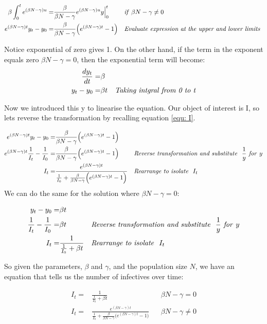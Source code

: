\documentclass[fontsize=17pt]{article}
\begin{document}
 \begin{align}
\beta \int_{0}^{t}e^{(\beta N- \gamma)u}=&\frac{\beta}{\beta N-\gamma}e^{(\beta N- \gamma)u}y\Big|_0^t&& \text{\textit{if} }\beta N-\gamma \neq 0\\
e^{(\beta N- \gamma)t}y_{t}-y_{0}=&\frac{\beta}{\beta N-\gamma}\Big(e^{(\beta N- \gamma)t}-1\Big)&& \text{\textit{Evaluate expression at the upper and lower limits} }
\end{align}

Notice exponential of zero gives 1. On the other hand, if the term in the exponent equals zero $\beta N -\gamma=0$, then the exponential term will become:
\begin{align}
	\frac{dy_{t}}{dt}=&\beta&&\\
	y_{t}-y_{0}=&\beta t&& \text{\textit{Taking intgral from 0 to t}}
\end{align}

Now we introduced this y to linearise the equation. Our object of interest is I, so lets reverse the transformation by recalling equation \ref{equ: I}.

 \begin{align}
e^{(\beta N- \gamma)t}y_{t}-y_{0}=&\frac{\beta}{\beta N-\gamma}\Big(e^{(\beta N- \gamma)t}-1\Big)&&\\
e^{(\beta N- \gamma)t}\frac{1}{I_{t}}-\frac{1}{I_{0}}=&\frac{\beta}{\beta N-\gamma}\Big(e^{(\beta N- \gamma)t}-1\Big)&& \text{\textit{Reverse transformation and substitute } }\frac{1}{y} \text{\textit{ for }} y\\
I_{t}=&\frac{e^{(\beta N- \gamma)t}}{\frac{1}{I_{0}}+\frac{\beta}{\beta N-\gamma}\Big(e^{(\beta N- \gamma)t}-1\Big)}&& \text{\textit{Rearrange to isolate } }I_{t}
\end{align}
We can do the same for the solution where $\beta N -\gamma=0$:

\begin{align}
y_{t}-y_{0}=&\beta t&&\\
\frac{1}{I_{t}}-\frac{1}{I_{0}}=&\beta t&& \text{\textit{Reverse transformation and substitute } }\frac{1}{y} \text{\textit{ for }} y\\
I_{t}=&\frac{1}{\frac{1}{I_{0}}+\beta t}&& \text{\textit{Rearrange to isolate } }I_{t}
\end{align}

So given the parameters, $\beta$ and $\gamma$, and the population size $N$, we have an equation that tells us the number of infectives over time:

\begin{align}
\label{equ: zero_condition}I_{t}=&\frac{1}{\frac{1}{I_{0}}+\beta t}&& \beta N -\gamma=0\\
\label{equ: nonzero_condition}I_{t}=&\frac{e^{(\beta N- \gamma)t}}{\frac{1}{I_{0}}+\frac{\beta}{\beta N-\gamma}\Big(e^{(\beta N- \gamma)t}-1\Big)}&&\beta N -\gamma \neq 0\\
\end{align}
\end{document}
